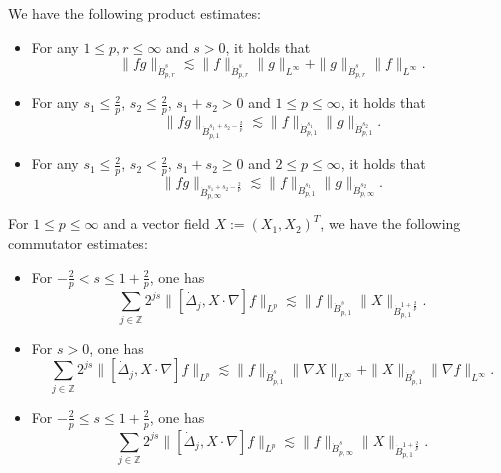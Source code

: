 \documentclass[reqno]{amsart}
\begin{document}
\begin{lemma}\label{lem2.3}
 We have the following product estimates:
 \begin{itemize}
\item For any $1\leqslant p,r\leqslant\infty$ and $s>0$, it holds that
 \begin{equation}\label{2.7}
 \|fg\|_{\dot{B}^s_{p,r}}\lesssim\|f\|_{\dot{B}^s_{p,r}}\|g\|_{L^\infty}+\|g\|_{\dot{B}^s_{p,r}}\|f\|_{L^\infty}.
 \end{equation}

\item For any $s_1\leqslant\frac{2}{p}$, $s_2\leqslant\frac{2}{p}$, $s_1+s_2>0$ and
$1\leqslant p\leqslant\infty$, it holds that
\begin{equation} \label{2.8}
 \|fg\|_{\dot{B}^{s_1+s_2-\frac{2}{p}}_{p,1}}\lesssim\|f\|_{\dot{B}^{s_1}_{p,1}}\|g\|_{\dot{B}^{s_2}_{p,1}}.
\end{equation}

\item For any $s_1\leqslant\frac{2}{p}$, $s_2<\frac{2}{p}$, $s_1+s_2\geqslant0$ and $2\leqslant p\leqslant\infty$, it holds that
\begin{equation}\label{2.9}
 \|fg\|_{\dot{B}^{s_1+s_2-\frac{2}{p}}_{p,\infty}}\lesssim\|f\|_{\dot{B}^{s_1}_{p,1}}\|g\|_{\dot{B}^{s_2}_{p,\infty}}.
\end{equation}
 \end{itemize}
\end{lemma}

\begin{lemma}\label{lem2.4}
For $1\leqslant p\leqslant\infty$ and a vector field $X:=(X_1,X_2)^T$, we have the
following commutator estimates:
 \begin{itemize}
\item For $-\frac{2}{p}<s\leqslant1+\frac{2}{p}$, one has
 \begin{equation}\label{2.10}
 \sum_{j\in\mathbb{Z}}2^{js}\|[\dot{\Delta}_j,X\cdot\nabla]f\|_{L^p}\lesssim\|f\|_{\dot{B}^s_{p,1}}\|X\|_{\dot{B}^{1+\frac{2}{p}}_{p,1}}.
 \end{equation}

\item For $s>0$, one has
 \begin{equation}\label{2.11}
 \sum_{j\in\mathbb{Z}}2^{js}\|[\dot{\Delta}_j,X\cdot\nabla]f\|_{L^p}\lesssim\|f\|_{\dot{B}^s_{p,1}}\|\nabla X\|_{L^\infty}+\|X\|_{\dot{B}^{s}_{p,1}}\|\nabla f\|_{L^\infty}.
 \end{equation}

\item For $-\frac{2}{p}\leqslant s\leqslant1+\frac{2}{p}$, one has
 \begin{equation}\label{2.12}
 \sum_{j\in\mathbb{Z}}2^{js}\|[\dot{\Delta}_j,X\cdot\nabla]f\|_{L^p}\lesssim\|f\|_{\dot{B}^s_{p,\infty}}\|X\|_{\dot{B}^{1+\frac{2}{p}}_{p,1}}.
 \end{equation}
\end{itemize}
\end{lemma}
\end{document}
